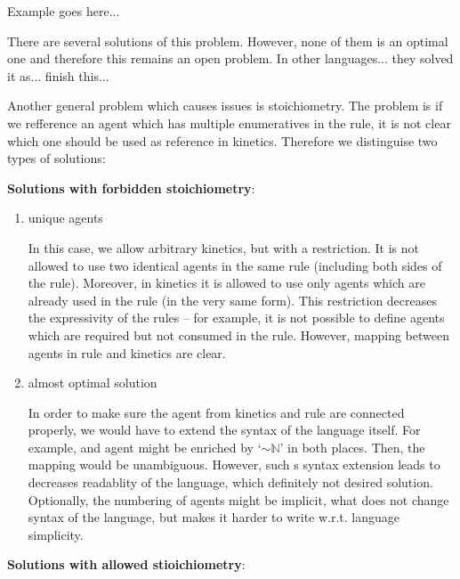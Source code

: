 \documentclass[12pt]{fithesis2}
\begin{document}
Example goes here...

There are several solutions of this problem. However, none of them is an optimal one and therefore this remains an open problem. In other languages... they solved it as... finish this...

Another general problem which causes issues is stoichiometry. The problem is if we refference an agent which has multiple enumeratives in the rule, it is not clear which one should be used as reference in kinetics. Therefore we distinguise two types of solutions:

\textbf{Solutions with forbidden stoichiometry}:

\begin{enumerate}
\item unique agents

In this case, we allow arbitrary kinetics, but with a restriction. It is not allowed to use two identical agents in the same rule (including both sides of the rule). Moreover, in kinetics it is allowed to use only agents which are already used in the rule (in the very same form). This restriction decreases the expressivity of the rules -- for example, it is not possible to define agents which are required but not consumed in the rule. However, mapping between agents in rule and kinetics are clear.

\item almost optimal solution

In order to make sure the agent from kinetics and rule are connected properly, we would have to extend the syntax of the language itself. For example, and agent might be enriched by `$\sim\mathbb{N}$' in both places. Then, the mapping would be unambiguous. However, such s syntax extension leads to decreases readablity of the language, which definitely not desired solution. Optionally, the numbering of agents might be implicit, what does not change syntax of the language, but makes it harder to write w.r.t. language simplicity.

\end{enumerate}


\textbf{Solutions with allowed stioichiometry}:
\end{document}
